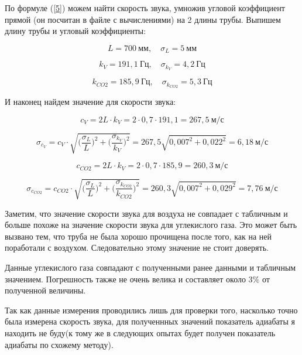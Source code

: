 \documentclass[12pt,a4paper]{article}
\begin{document}
\vspace{0.5cm}

По формуле (\ref{5}) можем найти скорость звука, умножив угловой коэффициент прямой (он посчитан в файле с вычислениями) на 2 длины трубы. Выпишем длину трубы и угловый коэффициенты:

\[L = 700 \: \textit{мм}, \quad \sigma_L = 5 \: \textit{мм}\]

\[k_{\textit{V}} = 191,1 \: \textit{Гц}, \quad \sigma_{k_{\textit{V}}} = 4,2 \: \textit{Гц}\]

\[k_{\textit{CO2}} = 185,9 \: \textit{Гц}, \quad \sigma_{k_{\textit{CO2}}} = 5,3 \: \textit{Гц}\]

\vspace{0.5cm}

И наконец найдем значение для скорости звука:

\[c_{V} = 2L \cdot k_{\textit{V}} = 2\cdot 0,7 \cdot 191,1 = 267,5 \: \textit{м}/ \textit{с}\]

\[\sigma_{c_{V}} = c_{V} \cdot \sqrt{\Big( \frac{\sigma_L}{L} \Big)^2 + \Big( \frac{\sigma_{k_{\textit{V}}}}{k_{\textit{V}}} \Big)^2} = 267,5 \sqrt{0,007^2 + 0,022^2} = 6,18 \: \textit{м}/ \textit{с}\]

\[c_{CO2} = 2L \cdot k_{\textit{V}} = 2\cdot 0,7 \cdot 185,9 = 260,3 \: \textit{м}/ \textit{с}\]

\[\sigma_{c_{CO2}} = c_{CO2} \cdot \sqrt{\Big( \frac{\sigma_L}{L} \Big)^2 + \Big( \frac{\sigma_{k_{\textit{CO2}}}}{k_{\textit{CO2}}} \Big)^2} = 260,3 \sqrt{0,007^2 + 0,029^2} = 7,76 \: \textit{м}/ \textit{с}\]

\vspace{0.5cm}

Заметим, что значение скорости звука для воздуха не совпадает с табличным и больше похоже на значение скорости звука для углекислого газа. Это может быть вызвано тем, что труба не была хорошо прочищена после того, как на ней поработали с воздухом. Следовательно этому значение не стоит доверять.

Данные углекислого газа совпадают с полученными ранее данными и табличным значением. Погрешность также не очень велика и составляет около $3\%$ от полученной величины.

Так как данные измерения проводились лишь для проверки того, насколько точно была измерена скорость звука, для полученнных значений показатель адиабаты я находить не буду(к тому же в следующих опытах будет получен показатель адиабаты по схожему методу).

\vspace{0.5cm}
\end{document}
